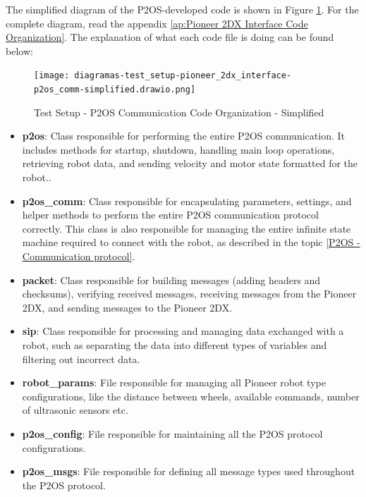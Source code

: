 \documentclass[../../monografia.tex]{subfiles}
\begin{document}
The simplified diagram of the P2OS-developed code is shown in Figure \ref{fig: Test Setup - P2OS Communication Code Organization - Simplified}. For the complete diagram, read the appendix \ref{ap:Pioneer 2DX Interface Code Organization}. The explanation of what each code file is doing can be found below:

\begin{figure}[h!]
    \caption{Test Setup - P2OS Communication Code Organization - Simplified}
    \centering
    \texttt{[image: diagramas-test\_setup-pioneer\_2dx\_interface-p2os\_comm-simplified.drawio.png]}
    \label{fig: Test Setup - P2OS Communication Code Organization - Simplified}
\end{figure}

\begin{itemize}
    \item \textbf{p2os}: Class responsible for performing the entire P2OS communication. It includes methods for startup, shutdown, handling main loop operations, retrieving robot data, and sending velocity and motor state formatted for the robot..
    \item \textbf{p2os\_comm}: Class responsible for encapsulating parameters, settings, and helper methods to perform the entire P2OS communication protocol correctly. This class is also responsible for managing the entire infinite state machine required to connect with the robot, as described in the topic \ref{P2OS - Communication protocol}.
    \item \textbf{packet}: Class responsible for building messages (adding headers and checksums), verifying received messages, receiving messages from the Pioneer 2DX, and sending messages to the Pioneer 2DX.
    \item \textbf{sip}: Class responsible for processing and managing data exchanged with a robot, such as separating the data into different types of variables and filtering out incorrect data.
    \item \textbf{robot\_params}: File responsible for managing all Pioneer robot type configurations, like the distance between wheels, available commands, number of ultrasonic sensors etc.
    \item \textbf{p2os\_config}: File responsible for maintaining all the P2OS protocol configurations.
    \item \textbf{p2os\_msgs}: File responsible for defining all message types used throughout the P2OS protocol.
\end{itemize}
\end{document}
